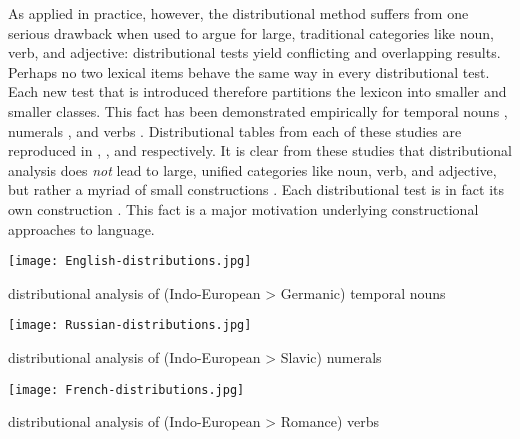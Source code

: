 As applied in practice, however, the distributional method suffers from one serious drawback when used to argue for large, traditional categories like noun, verb, and adjective: distributional tests yield conflicting and overlapping results. Perhaps no two lexical items behave the same way in every distributional test. Each new test that is introduced therefore partitions the lexicon into smaller and smaller classes. This fact has been demonstrated empirically for  temporal nouns \parencite[54]{Crystal1967},  numerals \parencite{Corbett1978}, and  verbs \parencite{Gross1979}. Distributional tables from each of these studies are reproduced in , , and  respectively. It is clear from these studies that distributional analysis does \emph{not} lead to large, unified categories like noun, verb, and adjective, but rather a myriad of small constructions \parencites[27]{Crystal1967}[434]{Croft2005}. Each distributional test is in fact its own construction \parencite[436]{Croft2005}. This fact is a major motivation underlying constructional approaches to language.

\begin{table}[h!]
  \texttt{[image: English-distributions.jpg]}
  \caption[Distributional analysis of English (Indo-European > Germanic) temporal nouns]{distributional analysis of  (Indo-European > Germanic) temporal nouns \parencite[54]{Crystal1967}}
  \label{tab:English-distributions-b}
\end{table}

\begin{table}[h!]
  \texttt{[image: Russian-distributions.jpg]}
  \caption[Distributional analysis of Russian (Indo-European > Slavic) numerals]{distributional analysis of  (Indo-European > Slavic) numerals \parencite[359]{Corbett1978}}
  \label{tab:Russian-distributions}
\end{table}

\begin{table}[h!]
  \texttt{[image: French-distributions.jpg]}
  \caption[Distributional analysis of French (Indo-European > Romance) verbs]{distributional analysis of  (Indo-European > Romance) verbs \parencite[860]{Gross1979}}
  \label{tab:French-distributions}
\end{table}

